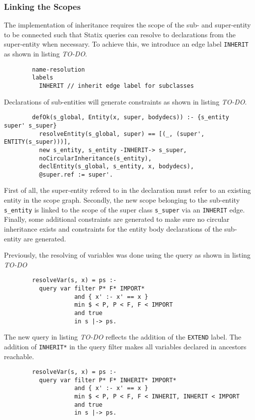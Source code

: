     \subsubsection{Linking the Scopes}
      The implementation of inheritance requires the scope of the sub- and super-entity to be connected such that Statix queries can resolve to declarations from the super-entity when necessary. To achieve this, we introduce an edge label \texttt{INHERIT} as shown in listing \emph{TO-DO}.
      \begin{lstlisting}
        name-resolution
        labels
          INHERIT // inherit edge label for subclasses
      \end{lstlisting}
      Declarations of sub-entities will generate constraints as shown in listing \emph{TO-DO}.
      \begin{lstlisting}
        defOk(s_global, Entity(x, super, bodydecs)) :- {s_entity super' s_super}
          resolveEntity(s_global, super) == [(_, (super', ENTITY(s_super)))],
          new s_entity, s_entity -INHERIT-> s_super,
          noCircularInheritance(s_entity),
          declEntity(s_global, s_entity, x, bodydecs),
          @super.ref := super'.
      \end{lstlisting}
      First of all, the super-entity refered to in the declaration must refer to an existing entity in the scope graph. Secondly, the new scope belonging to the sub-entity \texttt{s\_entity} is linked to the scope of the super class \texttt{s\_super} via an \texttt{INHERIT} edge. Finally, some additional constraints are generated to make sure no circular inheritance exists and constraints for the entity body declarations of the sub-entity are generated.

      Previously, the resolving of variables was done using the query as shown in listing \emph{TO-DO}
      \begin{lstlisting}
        resolveVar(s, x) = ps :-
          query var filter P* F* IMPORT*
                    and { x' :- x' == x }
                    min $ < P, P < F, F < IMPORT
                    and true
                    in s |-> ps.
      \end{lstlisting}
      The new query in listing \emph{TO-DO} reflects the addition of the \texttt{EXTEND} label. The addition of \texttt{INHERIT*} in the query filter makes all variables declared in ancestors reachable.
      \begin{lstlisting}
        resolveVar(s, x) = ps :-
          query var filter P* F* INHERIT* IMPORT*
                    and { x' :- x' == x }
                    min $ < P, P < F, F < INHERIT, INHERIT < IMPORT
                    and true
                    in s |-> ps.
      \end{lstlisting}

